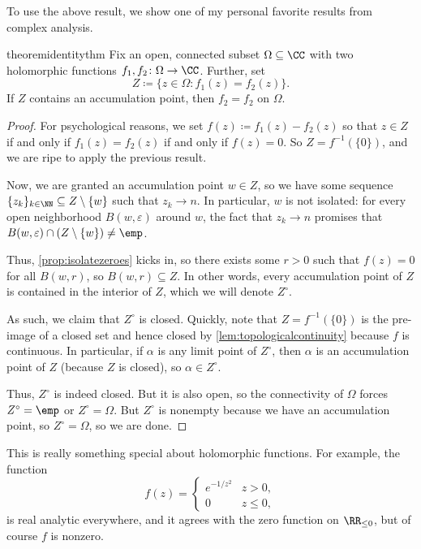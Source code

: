 To use the above result, we show one of my personal favorite results from complex analysis.
\begin{restatable}[Identity]{theorem}{identitythm} \label{thm:id}
	Fix an open, connected subset $\Omega\subseteq\CC$ with two holomorphic functions $f_1,f_2\colon\Omega \to\CC$. Further, set
	\[Z\coloneqq \{z\in\Omega:f_1(z)=f_2(z)\}.\]
	If $Z$ contains an accumulation point, then $f_2=f_2$ on $\Omega$.
\end{restatable}
\begin{proof}
	For psychological reasons, we set $f(z)\coloneqq f_1(z)-f_2(z)$ so that $z\in Z$ if and only if $f_1(z)=f_2(z)$ if and only if $f(z)=0$. So $Z=f^{-1}(\{0\})$, and we are ripe to apply the previous result.

	Now, we are granted an accumulation point $w\in Z$, so we have some sequence $\{z_k\}_{k\in\NN}\subseteq Z\setminus\{w\}$ such that $z_k\to n$. In particular, $w$ is not isolated: for every open neighborhood $B(w,\varepsilon)$ around $w$, the fact that $z_k\to n$ promises that $B(w,\varepsilon)\cap(Z\setminus\{w\})\ne\emp$.

	Thus, \autoref{prop:isolatezeroes} kicks in, so there exists some $r>0$ such that $f(z)=0$ for all $B(w,r)$, so $B(w,r)\subseteq Z$. In other words, every accumulation point of $Z$ is contained in the interior of $Z$, which we will denote $Z^\circ$.

	As such, we claim that $Z^\circ$ is closed. Quickly, note that $Z=f^{-1}(\{0\})$ is the pre-image of a closed set and hence closed by \autoref{lem:topologicalcontinuity} because $f$ is continuous.
	In particular, if $\alpha$ is any limit point of $Z^\circ$, then $\alpha$ is an accumulation point of $Z$ (because $Z$ is closed), so $\alpha\in Z^\circ$.

	Thus, $Z^\circ$ is indeed closed. But it is also open, so the connectivity of $\Omega$ forces $Z^\circ=\emp$ or $Z^\circ=\Omega$. But $Z^\circ$ is nonempty because we have an accumulation point, so $Z^\circ=\Omega$, so we are done.
\end{proof}
\begin{remark}
	This is really something special about holomorphic functions. For example, the function
	\[f(z)=\begin{cases}
		e^{-1/z^2} & z>0, \\
		0 & z\le0,
	\end{cases}\]
	is real analytic everywhere, and it agrees with the zero function on $\RR_{\le0}$, but of course $f$ is nonzero.
\end{remark}
